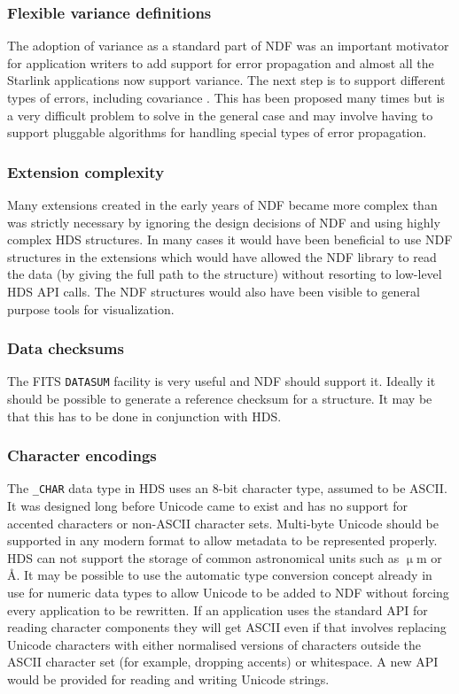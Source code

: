 \documentclass[final,authoryear,5p,times,twocolumn]{elsarticle}
\begin{document}
\subsubsection{Flexible variance definitions}

The adoption of variance as a standard part of NDF was an important
motivator for application writers to add support for error propagation and
almost all the Starlink applications now support variance. The next
step is to support different types of errors, including
covariance \citep[see e.g.][]{1992ESOC...41...47M}. This has been proposed many times \citep[see
e.g.][]{1991STARB...8...19M} but is a very difficult problem to solve
in the general case and may involve having to support pluggable
algorithms for handling special types of error propagation.

\subsubsection{Extension complexity}

Many extensions created in the early years of NDF became more complex
than was strictly necessary by ignoring the design decisions of NDF and
using highly complex HDS structures. In many cases it would have been
beneficial to use NDF structures in the extensions which would have
allowed the NDF library to read the data (by giving the full path to
the structure) without resorting to low-level HDS API calls. The NDF
structures would also have been visible to general purpose tools for
visualization.

\subsubsection{Data checksums}

The FITS \texttt{DATASUM} facility \citep{2012arXiv1201.1345S} is very useful and NDF should support
it. Ideally it should be possible to generate a reference checksum for
a structure. It may be that this has to be done in conjunction with
HDS.

\subsubsection{Character encodings}

The \texttt{\_CHAR} data type in HDS uses an 8-bit character type,
assumed to be ASCII. It was designed long before Unicode came to exist
and has no support for accented characters or non-ASCII character
sets. Multi-byte Unicode should be supported in any modern format to
allow metadata to be represented properly. HDS can not support the
storage of common astronomical units such as $\upmu$m or \AA.
It may be possible to use the automatic type conversion concept
already in use for numeric data types
to allow Unicode to be added to NDF without forcing every application
to be rewritten. If an application uses the standard API for reading character
components they will get ASCII even if that involves replacing Unicode
characters with either normalised versions of characters outside the
ASCII character set (for example, dropping accents) or whitespace. A new API
would be provided for reading and writing Unicode strings.
\end{document}
